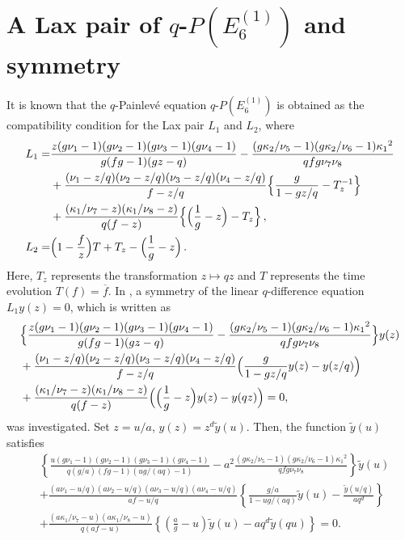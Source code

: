\documentclass[12pt]{amsart}
\numberwithin{equation}{section}
\theoremstyle{definition}
\begin{document}
\section{A Lax pair of $q$-$P(E^{(1)}_6)$ and symmetry}
It is known that the $q$-Painlev\'e equation $q$-$P(E^{(1)}_6)$ is obtained as the compatibility condition for the Lax pair $L_1$ and $L_2$, where
\begin{align}
    L_{1}=&\frac{ z (g\nu_{1}-1)(g\nu_{2}-1)(g\nu_{3}-1)(g\nu_{4}-1)}{g(fg-1) ( g z - q )}-\frac{( g\kappa_{2}/\nu_{5}-1 )( g\kappa_{2}/\nu_{6}-1 ){\kappa_{1}}^{2}}{q fg \nu_{7}\nu_{8}} \label{eq:E6L1} \\
& +\frac{(\nu_{1}- z/q )(\nu_{2}- z/q )(\nu_{3}- z/q )(\nu_{4}- z/q )}{f- z/q}\Bigl\{\frac{g}{1-g z/q}-T_{z}^{-1}\Bigr\} \nonumber \\
    &+\frac{( \kappa_{1}/\nu_{7}-z )( \kappa_{1}/\nu_{8}-z )}{q(f-z)}\Bigl\{\Bigl(\frac{1}{g}-z\Bigr)-T_{z}\Bigr\} \, , \nonumber  \\
    L_{2}=&\Bigl(1-\frac{f}{z}\Bigr)T+T_{z}-\Bigl(\frac{1}{g}-z\Bigr) \, . \nonumber 
\end{align}
Here, $T_{z}$ represents the transformation $z\mapsto qz$ and $T$ represents the time evolution $T(f)=\overline{f}$.
In \cite{TsqP}, a symmetry of the linear $q$-difference equation $L_1 y(z)= 0$, which is written as
\begin{align}
& \Bigl\{ \frac{ z (g\nu_{1}-1)(g\nu_{2}-1)(g\nu_{3}-1)(g\nu_{4}-1)}{g(fg-1) ( g z - q )}-\frac{( g\kappa_{2}/\nu_{5}-1 )( g\kappa_{2}/\nu_{6}-1 ){\kappa_{1}}^{2}}{q fg \nu_{7}\nu_{8}} \Bigr\} y(z) \label{eq:E6L1yz} \\
& +\frac{(\nu_{1}- z/q )(\nu_{2}- z/q )(\nu_{3}- z/q )(\nu_{4}- z/q )}{f- z/q} \Bigl( \frac{g}{1-g z/q} y(z) -y(z/q) \Bigr) \nonumber \\
& +\frac{( \kappa_{1}/\nu_{7}-z )( \kappa_{1}/\nu_{8}-z )}{q(f-z)}\Bigl( \Bigl(\frac{1}{g}-z\Bigr) y(z)- y(qz) \Bigr) =0 , \nonumber 
\end{align}
was investigated.
Set $z =u/a$, $y(z)= z^d \tilde{y}(u) $.
Then, the function $\tilde{y}(u)$ satisfies
\begin{align}
 & \left\{  \frac{  u (g \nu _{1}-1)(g \nu _{2}-1)(g \nu _{3}-1)(g \nu _{4}-1)}{q (g/a) (fg-1)( u g /(a q ) -1 )}- a^2 \frac{ ( g \kappa_{2} /\nu_{5} -1 ) ( g \kappa_{2}/\nu_{6} - 1) {\kappa_{1}}^{2}}{q f g \nu_{7} \nu_{8}} \right\} \tilde{y}(u) \label{eq:E6tiy}\\
& + \frac{ ( a \nu_{1}- u/q )(a \nu_{2}- u/q )(a \nu_{3}- u/q )(a \nu_{4}- u/q ) }{a f- u/q}\left\{\frac{ g/a }{1-u g/(a q) } \tilde{y}(u) - \frac{\tilde{y}(u/q)}{a q^{d}} \right\} \nonumber \\
  & +\frac{( a \kappa_{1}/\nu_{7} -u )( a \kappa_{1}/\nu_{8} -u )}{q(a f-u)}\left\{\left(\frac{a}{g}-u \right) \tilde{y}(u) - a q^d \tilde{y}(q u) \right\} =0 . \nonumber 
\end{align}
\end{document}
